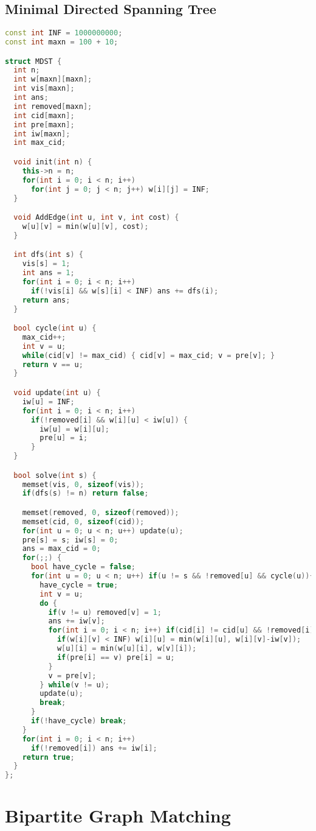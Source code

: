   \subsection{Minimal Directed Spanning Tree}
  \begin{lstlisting}[language=C++]
const int INF = 1000000000;
const int maxn = 100 + 10;

struct MDST {
  int n;
  int w[maxn][maxn]; 
  int vis[maxn];
  int ans;         
  int removed[maxn];
  int cid[maxn];
  int pre[maxn];
  int iw[maxn];
  int max_cid;

  void init(int n) {
    this->n = n;
    for(int i = 0; i < n; i++)
      for(int j = 0; j < n; j++) w[i][j] = INF;
  }

  void AddEdge(int u, int v, int cost) {
    w[u][v] = min(w[u][v], cost);
  }

  int dfs(int s) {
    vis[s] = 1;
    int ans = 1;
    for(int i = 0; i < n; i++)
      if(!vis[i] && w[s][i] < INF) ans += dfs(i);
    return ans;
  }

  bool cycle(int u) {
    max_cid++;
    int v = u;
    while(cid[v] != max_cid) { cid[v] = max_cid; v = pre[v]; }
    return v == u;
  }

  void update(int u) {
    iw[u] = INF;
    for(int i = 0; i < n; i++)
      if(!removed[i] && w[i][u] < iw[u]) {
        iw[u] = w[i][u];
        pre[u] = i;
      }
  }

  bool solve(int s) {    
    memset(vis, 0, sizeof(vis));
    if(dfs(s) != n) return false;

    memset(removed, 0, sizeof(removed));
    memset(cid, 0, sizeof(cid));
    for(int u = 0; u < n; u++) update(u);
    pre[s] = s; iw[s] = 0;
    ans = max_cid = 0;
    for(;;) {
      bool have_cycle = false;
      for(int u = 0; u < n; u++) if(u != s && !removed[u] && cycle(u)){
        have_cycle = true;
        int v = u;
        do {
          if(v != u) removed[v] = 1;
          ans += iw[v];
          for(int i = 0; i < n; i++) if(cid[i] != cid[u] && !removed[i]) {
            if(w[i][v] < INF) w[i][u] = min(w[i][u], w[i][v]-iw[v]);
            w[u][i] = min(w[u][i], w[v][i]);
            if(pre[i] == v) pre[i] = u;
          }
          v = pre[v];
        } while(v != u);        
        update(u);
        break;
      }
      if(!have_cycle) break;
    }
    for(int i = 0; i < n; i++)
      if(!removed[i]) ans += iw[i];
    return true;
  }
};
  \end{lstlisting}



 \section{Bipartite Graph Matching}
